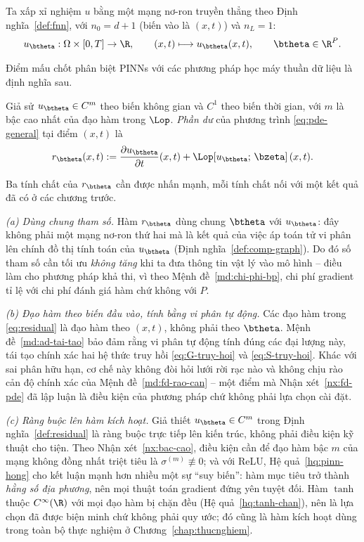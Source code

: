 Ta xấp xỉ nghiệm $u$ bằng một mạng nơ-ron truyền thẳng theo
Định nghĩa~\ref{def:fnn}, với $n_0 = d+1$ (biến vào là $(x,t)$) và $n_L = 1$:
\begin{equation}
u_{\btheta} : \Omega \times [0,T] \to \R,
\qquad
(x,t) \longmapsto u_{\btheta}(x,t),
\qquad \btheta \in \R^{P}.
\label{eq:network-surrogate}
\end{equation}
 
Điểm mấu chốt phân biệt PINNs với các phương pháp học máy thuần dữ liệu là định
nghĩa sau.
 
\begin{definition}[Phần dư]
\label{def:residual}
Giả sử $u_{\btheta} \in C^{m}$ theo biến không gian và $C^1$ theo biến thời gian,
với $m$ là bậc cao nhất của đạo hàm trong $\Lop$. \emph{Phần dư} của phương
trình \eqref{eq:pde-general} tại điểm $(x,t)$ là
\begin{equation}
r_{\btheta}(x,t)
:= \frac{\partial u_{\btheta}}{\partial t}(x,t)
 + \Lop\!\left[u_{\btheta};\, \bzeta\right](x,t).
\label{eq:residual}
\end{equation}
\end{definition}
 
Ba tính chất của $r_{\btheta}$ cần được nhấn mạnh, mỗi tính chất nối với một kết
quả đã có ở các chương trước.
 
\emph{(a) Dùng chung tham số.} Hàm $r_{\btheta}$ dùng chung $\btheta$ với
$u_{\btheta}$: đây không phải một mạng nơ-ron thứ hai mà là kết quả của việc áp
toán tử vi phân lên chính đồ thị tính toán của $u_{\btheta}$
(Định nghĩa~\ref{def:comp-graph}). Do đó số tham số cần tối ưu \emph{không tăng}
khi ta đưa thông tin vật lý vào mô hình -- điều làm cho phương pháp khả thi, vì
theo Mệnh đề~\ref{md:chi-phi-bp}, chi phí gradient tỉ lệ với chi phí đánh giá hàm
chứ không với $P$.
 
\emph{(b) Đạo hàm theo biến đầu vào, tính bằng vi phân tự động.} Các đạo hàm
trong \eqref{eq:residual} là đạo hàm theo $(x,t)$, không phải theo $\btheta$.
Mệnh đề~\ref{md:ad-tai-tao} bảo đảm rằng vi phân tự động tính đúng các đại lượng
này, tái tạo chính xác hai hệ thức truy hồi \eqref{eq:G-truy-hoi} và
\eqref{eq:S-truy-hoi}. Khác với sai phân hữu hạn, cơ chế này không đòi hỏi lưới
rời rạc nào và không chịu rào cản độ chính xác của
Mệnh đề~\ref{md:fd-rao-can} -- một điểm mà Nhận xét~\ref{nx:fd-pde} đã lập luận
là điều kiện của phương pháp chứ không phải lựa chọn cài đặt.
 
\emph{(c) Ràng buộc lên hàm kích hoạt.} Giả thiết $u_{\btheta} \in C^m$ trong
Định nghĩa~\ref{def:residual} là ràng buộc trực tiếp lên kiến trúc, không phải
điều kiện kỹ thuật cho tiện. Theo Nhận xét~\ref{nx:bac-cao}, điều kiện cần để đạo
hàm bậc $m$ của mạng không đồng nhất triệt tiêu là $\sigma^{(m)} \not\equiv 0$;
và với ReLU, Hệ quả~\ref{hq:pinn-hong} cho kết luận mạnh hơn nhiều một sự ``suy
biến'': hàm mục tiêu trở thành \emph{hằng số địa phương}, nên mọi thuật toán
gradient đứng yên tuyệt đối. Hàm $\tanh$ thuộc $C^{\infty}(\R)$ với mọi đạo hàm
bị chặn đều (Hệ quả~\ref{hq:tanh-chan}), nên là lựa chọn đã được biện minh chứ
không phải quy ước; đó cũng là hàm kích hoạt dùng trong toàn bộ thực nghiệm ở
Chương~\ref{chap:thucnghiem}.
 
